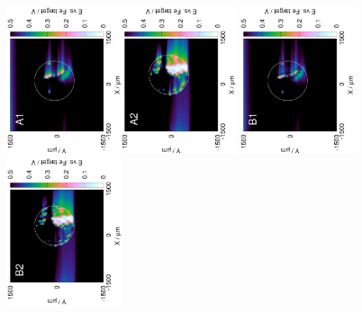 \documentclass[3p]{elsarticle}
\begin{document}
\begin{figure}[H]
\centering
\includegraphics[trim = 15mm 30mm 0mm 15mm, clip, width=0.3\textwidth, angle=-90]{18012501.eps}\includegraphics[trim = 15mm 30mm 0mm 15mm, clip, width=0.3\textwidth, angle=-90]{18012406.eps}
\includegraphics[trim = 15mm 30mm 0mm 15mm, clip, width=0.3\textwidth, angle=-90]{18012501_deconvoluted.eps}\includegraphics[trim = 15mm 30mm 0mm 15mm, clip, width=0.3\textwidth, angle=-90]{18012406_deconvoluted.eps}

\end{figure}
\end{document}

